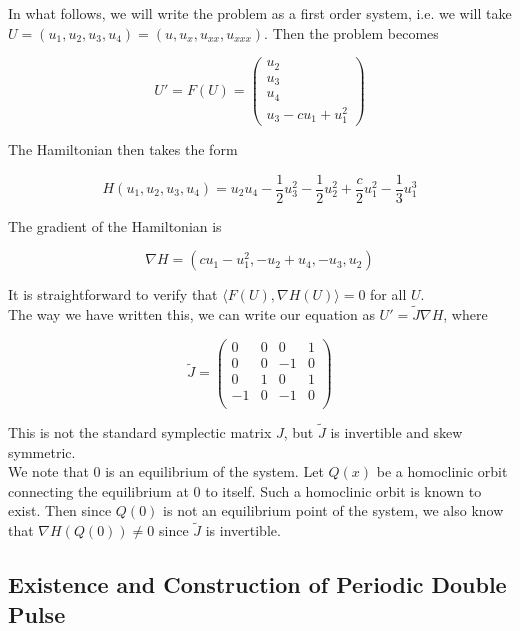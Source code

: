 \documentclass[12pt]{article}
\begin{document}
In what follows, we will write the problem as a first order system, i.e. we will take $U = (u_1, u_2, u_3, u_4) = (u, u_x, u_{xx}, u_{xxx})$. Then the problem becomes

\begin{equation}\label{4thordersystem}
U' = F(U) = \begin{pmatrix} 
u_2 \\ u_3 \\ u_4 \\ u_3 - c u_1 + u_1^2
\end{pmatrix}
\end{equation}

The Hamiltonian then takes the form

\begin{equation}
H(u_1, u_2, u_3, u_4) = u_2 u_4 - \frac{1}{2}u_3^2 - \frac{1}{2}u_2^2 + \frac{c}{2}u_1^2 - \frac{1}{3}u_1^3
\end{equation}

The gradient of the Hamiltonian is

\begin{equation}
\nabla H = (cu_1 - u_1^2, -u_2 + u_4, -u_3, u_2)
\end{equation}

It is straightforward to verify that $\langle F(U), \nabla H(U) \rangle = 0$ for all $U$.\\

The way we have written this, we can write our equation as $U' = \tilde{J} \nabla H$, where

\[
\tilde{J} = \begin{pmatrix}
0 & 0 & 0 & 1 \\
0 & 0 & -1 & 0 \\
0 & 1 & 0 & 1 \\
-1 & 0 & -1 & 0 \\
\end{pmatrix}
\]

This is not the standard symplectic matrix $J$, but $\tilde{J}$ is invertible and skew symmetric. \\

We note that 0 is an equilibrium of the system. Let $Q(x)$ be a homoclinic orbit connecting the equilibrium at 0 to itself. Such a homoclinic orbit is known to exist. Then since $Q(0)$ is not an equilibrium point of the system, we also know that $\nabla H(Q(0)) \neq 0$ since $\tilde{J}$ is invertible.

\subsection{Existence and Construction of Periodic Double Pulse}
\end{document}
